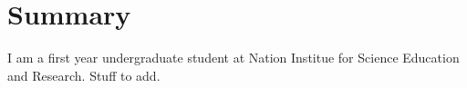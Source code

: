 
\section{Summary}
I am a first year undergraduate student at Nation Institue for Science Education and Research.
Stuff to add.
